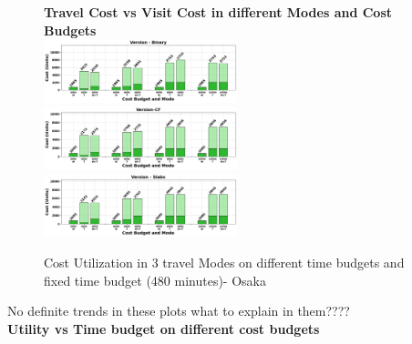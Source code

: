 \begin{figure}[th]
\textbf{Travel Cost vs Visit Cost in different Modes and Cost Budgets}\\
\includegraphics[width=0.5\textwidth]{plots/CU4_pkj.png}
\includegraphics[width=0.5\textwidth]{plots/CU5_pkj.png}
\includegraphics[width=0.5\textwidth]{plots/CU6_pkj.png}
\hspace{8pt}
\caption{Cost Utilization in 3 travel Modes on different time budgets and fixed time budget (480 minutes)- Osaka}
\label{fig:CostUtilization2}
\end{figure}

No definite trends in these plots what to explain in them????\\


\noindent\textbf{Utility vs Time budget on different cost budgets}\\

